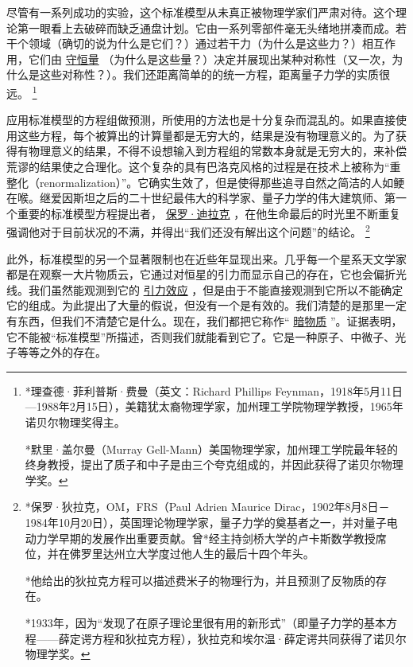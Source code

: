      尽管有一系列成功的实验，这个标准模型从未真正被物理学家们严肃对待。这个理论第一眼看上去破碎而缺乏通盘计划。它由一系列零部件毫无头绪地拼凑而成。若干个领域（确切的说为什么是它们？）通过若干力（为什么是这些力？）相互作用，它们由
\href{http://toyhouse.cc/wiki/index.php/守恒量}{守恒量}
（为什么是这些量？）决定并展现出某种对称性（又一次，为什么是这些对称性？）。我们还距离简单的的统一方程，距离量子力学的实质很远。
\footnote[3]
{
*理查德·菲利普斯·费曼（英文：Richard Phillips Feynman，1918年5月11日—1988年2月15日），美籍犹太裔物理学家，加州理工学院物理学教授，1965年诺贝尔物理奖得主。

*默里·盖尔曼（Murray Gell-Mann）美国物理学家，加州理工学院最年轻的终身教授，提出了质子和中子是由三个夸克组成的，并因此获得了诺贝尔物理学奖。
}
 
    应用标准模型的方程组做预测，所使用的方法也是十分复杂而混乱的。如果直接使用这些方程，每个被算出的计算量都是无穷大的，结果是没有物理意义的。为了获得有物理意义的结果，不得不设想输入到方程组的常数本身就是无穷大的，来补偿荒谬的结果使之合理化。这个复杂的具有巴洛克风格的过程是在技术上被称为“重整化（renormalization）”。它确实生效了，但是使得那些追寻自然之简洁的人如鲠在喉。继爱因斯坦之后的二十世纪最伟大的科学家、量子力学的伟大建筑师、第一个重要的标准模型方程提出者，
\href{http://toyhouse.cc/wiki/index.php/保罗·迪拉克}{保罗·迪拉克}
，在他生命最后的时光里不断重复强调他对于目前状况的不满，并得出“我们还没有解出这个问题”的结论。
\footnote[4]
{
*保罗·狄拉克，OM，FRS（Paul Adrien Maurice Dirac，1902年8月8日－1984年10月20日），英国理论物理学家，量子力学的奠基者之一，并对量子电动力学早期的发展作出重要贡献。曾*经主持剑桥大学的卢卡斯数学教授席位，并在佛罗里达州立大学度过他人生的最后十四个年头。

*他给出的狄拉克方程可以描述费米子的物理行为，并且预测了反物质的存在。

*1933年，因为“发现了在原子理论里很有用的新形式”（即量子力学的基本方程——薛定谔方程和狄拉克方程），狄拉克和埃尔温·薛定谔共同获得了诺贝尔物理学奖。
}

    此外，标准模型的另一个显著限制也在近些年显现出来。几乎每一个星系天文学家都是在观察一大片物质云，它通过对恒星的引力而显示自己的存在，它也会偏折光线。我们虽然能观测到它的
\href{http://toyhouse.cc/wiki/index.php/引力效应}{引力效应}
，但是由于不能直接观测到它所以不能确定它的组成。为此提出了大量的假说，但没有一个是有效的。我们清楚的是那里一定有东西，但我们不清楚它是什么。现在，我们都把它称作“
\href{http://toyhouse.cc/wiki/index.php/暗物质}{暗物质}
”。证据表明，它不能被“标准模型”所描述，否则我们就能看到它了。它是一种原子、中微子、光子等等之外的存在。

